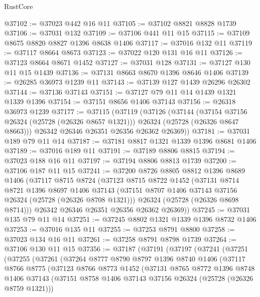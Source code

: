 \begin{lexlean}{RustCore}
\begin{coremodule}
@37102 := @37023 @442 @16 @11
@37105 := @37102 @8821 @8828 @1739
@37106 := @37031 @132
@37109 := @37106 @441 @11 @15
@37115 := @37109 @8675 @8820 @8827 @1396 @8638 @1406
@37117 := @37016 @132 @11
@37119 := @37117 @8664 @8673
@37123 := @37022 @120 @131 @16 @11
@37126 := @37123 @8664 @8671 @1452
@37127 := @37031 @128
@37131 := @37127 @130 @11 @15 @1439
@37136 := @37131 @8663 @8670 @1396 @8646 @1406
@37139 := @26285 @36973 @1239 @11
@37143 := @37139 @127 @1439 @26296 @26302
@37144 := @37136 @37143
@37151 := @37127 @79 @11 @14 @1439 @1321 @1339 @1396
@37154 := @37151 @8656 @1406 @37143
@37156 := @26318 @36973 @1239
@37177 := @37115
    (@37119
      (@37126
        (@37144
          (@37154 @37156 @26324 (@25728 (@26326 @8657 @1321)))
          @26324
          (@25728 (@26326 @8647 @8663)))
        @26342
        @26346
        @26351
        @26356
        @26362
        @26369))
@37181 := @37031 @189 @79 @11 @14
@37187 := @37181 @8817 @1321 @1339 @1396 @8681 @1406
@37189 := @37016 @189 @11
@37191 := @37189 @8806 @8815
@37194 := @37023 @188 @16 @11
@37197 := @37194 @8806 @8813 @1739
@37200 := @37106 @187 @11 @15
@37241 := @37200
    @8726
    @8805
    @8812
    @1396
    @8689
    @1406
    (@37117
      @8715
      @8724
      (@37123
        @8715
        @8722
        @1452
        (@37131
          @8714
          @8721
          @1396
          @8697
          @1406
          @37143
          (@37151 @8707 @1406 @37143 @37156 @26324 (@25728 (@26326 @8708 @1321)))
          @26324
          (@25728 (@26326 @8698 @8714)))
        @26342
        @26346
        @26351
        @26356
        @26362
        @26369))
@37245 := @37031 @135 @79 @11 @14
@37251 := @37245 @8802 @1321 @1339 @1396 @8732 @1406
@37253 := @37016 @135 @11
@37255 := @37253 @8791 @8800
@37258 := @37023 @134 @16 @11
@37261 := @37258 @8791 @8798 @1739
@37264 := @37106 @130 @11 @15
@37356 := @37187
    (@37191
      (@37197
        (@37241
          (@37251
            (@37255
              (@37261
                (@37264
                  @8777
                  @8790
                  @8797
                  @1396
                  @8740
                  @1406
                  (@37117
                    @8766
                    @8775
                    (@37123
                      @8766
                      @8773
                      @1452
                      (@37131
                        @8765
                        @8772
                        @1396
                        @8748
                        @1406
                        @37143
                        (@37151 @8758 @1406 @37143 @37156 @26324 (@25728 (@26326 @8759 @1321)))

\end{coremodule}
\end{lexlean}
